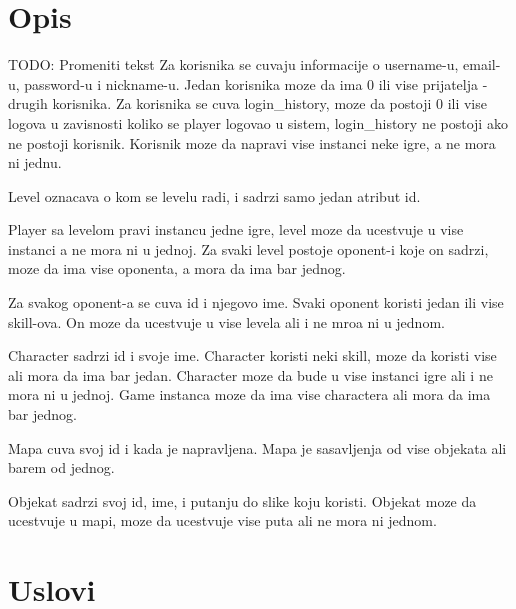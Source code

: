 \documentclass{article}
\begin{document}
\section {Opis}
TODO: Promeniti tekst
Za korisnika se cuvaju informacije o username-u, email-u, password-u i nickname-u.
Jedan korisnika moze da ima 0 ili vise prijatelja - drugih korisnika.
Za korisnika se cuva login\_history, moze da postoji 0 ili vise logova u zavisnosti koliko se player logovao u sistem, login\_history ne postoji ako ne postoji korisnik.
Korisnik moze da napravi vise instanci neke igre, a ne mora ni jednu.

Level oznacava o kom se levelu radi, i sadrzi samo jedan atribut id.

Player sa levelom pravi instancu jedne igre, level moze da ucestvuje u vise instanci a ne mora ni u jednoj.
Za svaki level postoje oponent-i koje on sadrzi, moze da ima vise oponenta, a mora da ima bar jednog.

Za svakog oponent-a se cuva id i njegovo ime. Svaki oponent koristi jedan ili vise skill-ova. On moze da ucestvuje u vise levela ali i ne mroa ni u jednom.

Character sadrzi id i svoje ime. 
Character koristi neki skill, moze da koristi vise ali mora da ima bar jedan.
Character moze da bude u vise instanci igre ali i ne mora ni u jednoj.
Game instanca moze da ima vise charactera ali mora da ima bar jednog.

Mapa cuva svoj id i kada je napravljena. 
Mapa je sasavljenja od vise objekata ali barem od jednog.

Objekat sadrzi svoj id, ime, i putanju do slike koju koristi.
Objekat moze da ucestvuje u mapi, moze da ucestvuje vise puta ali ne mora ni jednom.

\section {Uslovi}
\end{document}
